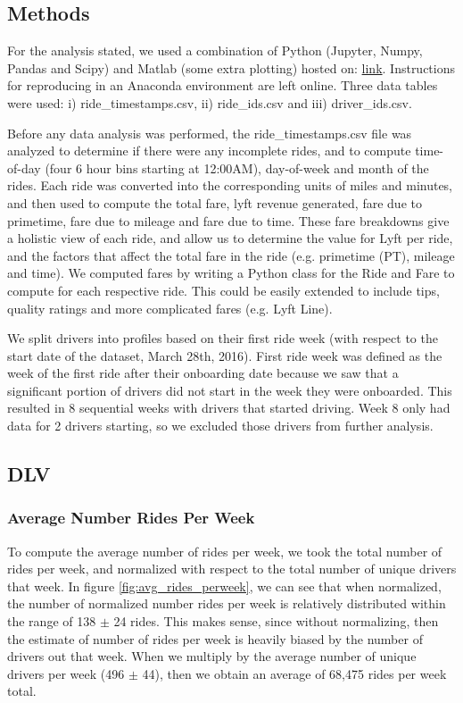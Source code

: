 \documentclass{report}
\begin{document}
	\subsection{Methods}
		For the analysis stated, we used a combination of Python (Jupyter, Numpy, Pandas and Scipy) and Matlab (some extra plotting) hosted on: \href{https://github.com/adam2392/lyft_data_challenge}{link}. Instructions for reproducing in an Anaconda environment are left online. Three data tables were used: i) ride\_timestamps.csv, ii) ride\_ids.csv and iii) driver\_ids.csv.

		Before any data analysis was performed, the ride\_timestamps.csv file was analyzed to determine if there were any incomplete rides, and to compute time-of-day (four 6 hour bins starting at 12:00AM), day-of-week and month of the rides. Each ride was converted into the corresponding units of miles and minutes, and then used to compute the total fare, lyft revenue generated, fare due to primetime, fare due to mileage and fare due to time. These fare breakdowns give a holistic view of each ride, and allow us to determine the value for Lyft per ride, and the factors that affect the total fare in the ride (e.g. primetime (PT), mileage and time). We computed fares by writing a Python class for the Ride and Fare to compute for each respective ride. This could be easily extended to include tips, quality ratings and more complicated fares (e.g. Lyft Line). 

		We split drivers into profiles based on their first ride week (with respect to the start date of the dataset, March 28th, 2016). First ride week was defined as the week of the first ride after their onboarding date because we saw that a significant portion of drivers did not start in the week they were onboarded. This resulted in 8 sequential weeks with drivers that started driving. Week 8 only had data for 2 drivers starting, so we excluded those drivers from further analysis.

	\subsection{DLV}
	\subsubsection{Average Number Rides Per Week}

		To compute the average number of rides per week, we took the total number of rides per week, and normalized with respect to the total number of unique drivers that week. In figure \ref{fig:avg_rides_perweek}, we can see that when normalized, the number of normalized number rides per week is relatively distributed within the range of 138 $\pm$ 24 rides. This makes sense, since without normalizing, then the estimate of number of rides per week is heavily biased by the number of drivers out that week. When we multiply by the average number of unique drivers per week (496 $\pm$ 44), then we obtain an average of 68,475 rides per week total.
\end{document}

